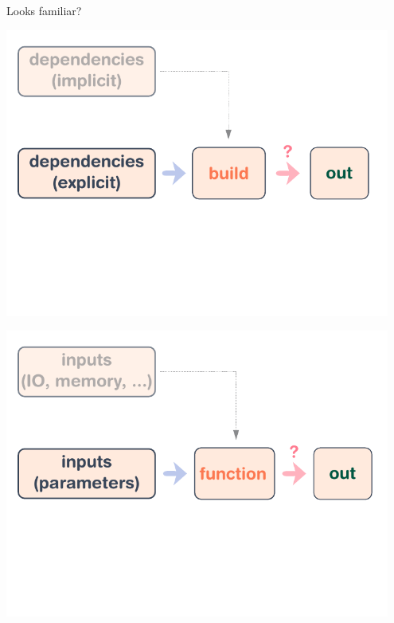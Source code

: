 \documentclass[t, aspectratio=169]{beamer}
\begin{document}
\begin{frame}{Looks familiar?}
     {
        \begin{center}
            \includegraphics[width=0.95\textwidth]{img/schema-build-simplified.pdf}
        \end{center}
    }
     {
        \begin{center}
            \includegraphics[width=0.95\textwidth]{img/schema-build-functional.pdf}
        \end{center}
    }
\end{frame}
\end{document}
